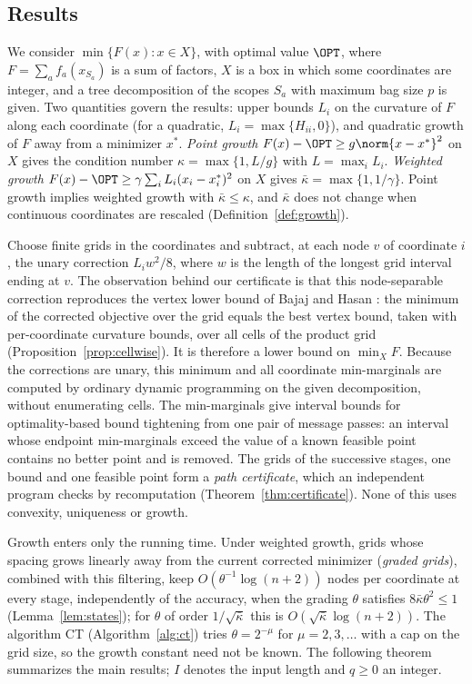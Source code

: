 \subsection{Results}\label{sec:intro-results}
We consider $\min\{F(x):x\in X\}$, with optimal value $\OPT$, where
$F=\sum_af_a(x_{S_a})$ is a sum of factors, $X$ is a box in which some coordinates are integer, and a
tree decomposition of the scopes $S_a$ with maximum bag size $p$ is given.
Two quantities govern the results: upper bounds $L_i$ on the curvature of $F$
along each coordinate (for a quadratic, $L_i=\max\{H_{ii},0\}$), and
quadratic growth of $F$ away from a minimizer $x^*$. \emph{Point growth}
$F(x)-\OPT\ge g\norm{x-x^*}^2$ on $X$ gives the condition number
$\kappa=\max\{1,L/g\}$ with $L=\max_iL_i$. \emph{Weighted growth}
$F(x)-\OPT\ge\gamma\sum_iL_i(x_i-x_i^*)^2$ on $X$ gives
$\bar\kappa=\max\{1,1/\gamma\}$. Point growth implies weighted growth with
$\bar\kappa\le\kappa$, and $\bar\kappa$ does not change when continuous
coordinates are rescaled (Definition~\ref{def:growth}).

Choose finite grids in the coordinates and subtract, at each node $v$ of
coordinate $i$, the unary correction $L_iw^2/8$, where $w$ is the length of the
longest grid interval ending at $v$. The observation behind our certificate is that this
node-separable correction reproduces the vertex lower bound of Bajaj and
Hasan \cite{BajajHasan2020}: the minimum of the corrected objective over the
grid equals the best vertex bound, taken with per-coordinate curvature
bounds, over all cells of the product grid (Proposition~\ref{prop:cellwise}).
It is therefore a lower bound on $\min_XF$. Because the corrections are
unary, this minimum and all coordinate min-marginals are computed by ordinary
dynamic programming on the given decomposition, without enumerating cells.
The min-marginals give interval
bounds for optimality-based bound tightening from one pair of message passes:
an interval whose endpoint min-marginals exceed the value of a known feasible
point contains no better point and is removed. The grids of the successive
stages, one bound and one feasible point form a \emph{path certificate},
which an independent program checks by recomputation
(Theorem~\ref{thm:certificate}). None of this uses convexity, uniqueness or
growth.

Growth enters only the running time. Under weighted growth, grids whose
spacing grows linearly away from the current corrected minimizer
(\emph{graded grids}), combined with this filtering, keep
$O(\theta^{-1}\log(n+2))$ nodes per coordinate at every stage, independently
of the accuracy, when the grading $\theta$ satisfies $8\bar\kappa\theta^2\le1$
(Lemma~\ref{lem:states}); for $\theta$ of order $1/\sqrt{\bar\kappa}$ this is
$O(\sqrt{\bar\kappa}\log(n+2))$. The algorithm CT
(Algorithm~\ref{alg:ct}) tries $\theta=2^{-\mu}$ for $\mu=2,3,\dots$ with a cap on
the grid size, so the growth constant need not be known. The following theorem
summarizes the main results; $I$ denotes the input length and $q\ge0$ an
integer.

